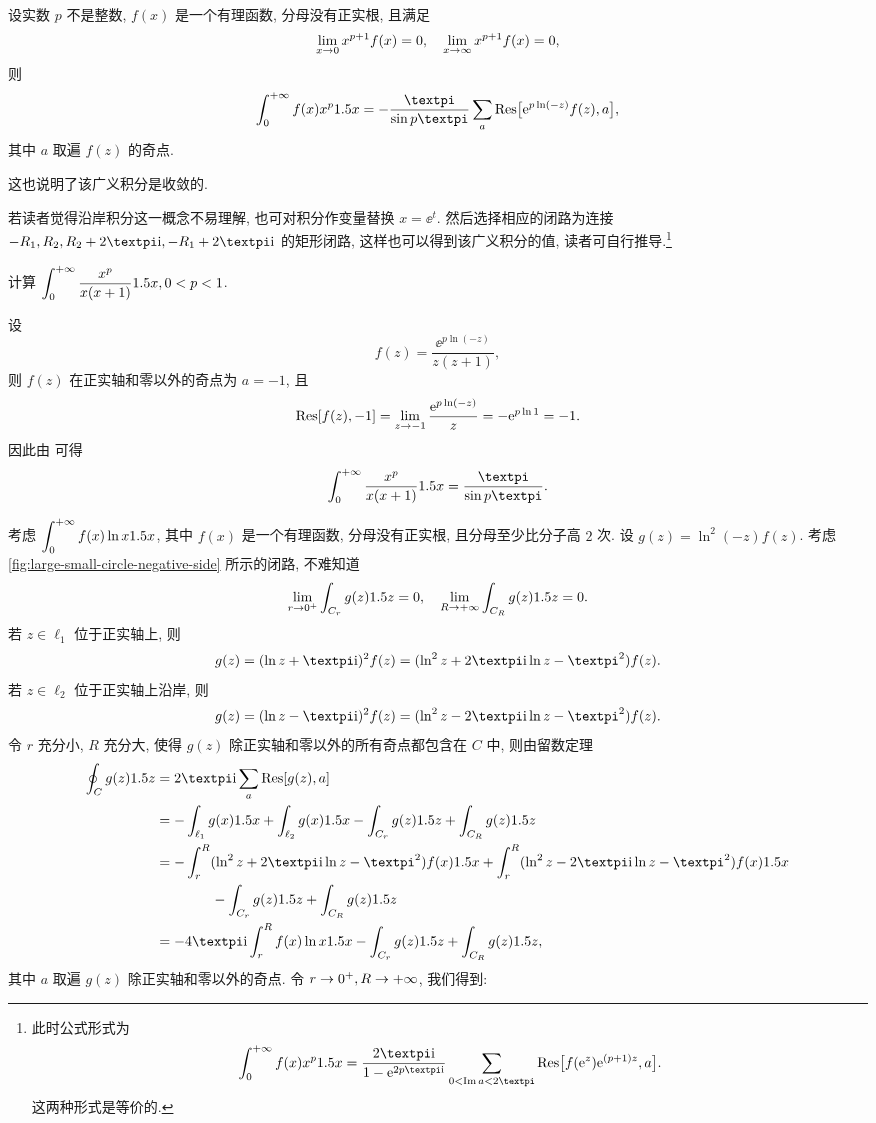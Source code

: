 \begin{theorem}
  \label{thm:integral-xp}
  设实数 $p$ 不是整数, $f(x)$ 是一个有理函数, 分母没有正实根, 且满足
  \[
    \lim_{x\rightarrow 0} x^{p+1}f(x)=0,\quad
    \lim_{x\rightarrow \infty} x^{p+1}f(x)=0,
  \]
  则
  \[
     \intf f(x)x^p\d x
    =-\frac{\cpi}{\sin{p\cpi}}\sum_a \Res\bigl[\ee^{p\ln(-z)}f(z),a\bigr],
  \]
  其中 $a$ 取遍 $f(z)$ 的奇点.
\end{theorem}
这也说明了该广义积分是收敛的.

若读者觉得沿岸积分这一概念不易理解, 也可对积分作变量替换 $x=\ee^t$.
然后选择相应的闭路为连接 $-R_1,R_2,R_2+2\cpi\ii,-R_1+2\cpi\ii$ 的矩形闭路, 这样也可以得到该广义积分的值, 读者可自行推导.\footnote{
  此时公式形式为
  \[
    \intf f(x)x^p\d x
    =\frac{2\cpi\ii}{1-\ee^{2p\cpi\ii}}\sum_{0<\Im a<2\cpi} \Res\bigl[f(\ee^z)\ee^{(p+1)z},a\bigr].
  \]
  这两种形式是等价的.
}

\begin{example}
  计算 $\displaystyle\int_0^{+\infty}\frac{x^p}{x(x+1)}1.5 x,0<p<1$.
\end{example}

\begin{solution}
  设
  \[
    f(z)=\frac{\ee^{p\ln(-z)}}{z(z+1)},
  \]
  则 $f(z)$ 在正实轴和零以外的奇点为 $a=-1$, 且
  \[
     {\mathrm{Res}}[f(z),-1]
    =\lim_{z\rightarrow-1}\frac{\mathrm{e}^{p\ln(-z)}}{z}
    =-\mathrm{e}^{p\ln 1}
    =-1.
  \]
  因此由 可得
  \[
     \intf\frac{x^p}{x(x+1)}\d x
    =\frac{\cpi}{\sin p\cpi}.
  \]
\end{solution}

考虑 $\displaystyle\int_0^{+\infty} f(x)\ln x1.5 x$, 其中 $f(x)$ 是一个有理函数, 分母没有正实根, 且分母至少比分子高 $2$ 次.
设 $g(z)=\ln^2(-z)f(z)$.
考虑\ref{fig:large-small-circle-negative-side} 所示的闭路, 不难知道
\[
  \lim_{r\rightarrow0^+}\int_{C_r}g(z)1.5 z=0,\quad 
  \lim_{R\rightarrow+\infty}\int_{C_R}g(z)1.5 z=0.
\]
若 $z\in\ell_1$ 位于正实轴上, 则
\[
   g(z)
  =(\ln z+\cpi\ii)^2f(z)
  =(\ln^2 z+2\cpi\ii \ln z-\cpi^2)f(z).
\]
若 $z\in\ell_2$ 位于正实轴上沿岸, 则
\[
   g(z)
  =(\ln z-\cpi\ii)^2f(z)
  =(\ln^2 z-2\cpi\ii \ln z-\cpi^2)f(z).
\]
令 $r$ 充分小, $R$ 充分大, 使得 $g(z)$ 除正实轴和零以外的所有奇点都包含在 $C$ 中, 则由留数定理
\begin{align*}
   \oint_C g(z)\d z&
  =2\cpi\ii\sum_a \Res[g(z),a]\\&
  =-\int_{\ell_1} g(x)\d x
    +\int_{\ell_2} g(x)\d x
    -\int_{C_r}g(z)\d z
    +\int_{C_R}g(z)\d z\\&
  =-\int_r^R (\ln^2 z+2\cpi\ii \ln z-\cpi^2)f(x)\d x
    +\int_r^R (\ln^2 z-2\cpi\ii \ln z-\cpi^2)f(x)\d x\\&
    \qquad \qquad 
    -\int_{C_r}g(z)\d z
    +\int_{C_R}g(z)\d z\\&
  =-4\cpi\ii \int_r^R f(x)\ln x\d x
  -\int_{C_r}g(z)\d z
  +\int_{C_R}g(z)\d z,
\end{align*}
其中 $a$ 取遍 $g(z)$ 除正实轴和零以外的奇点.
令 $r\rightarrow0^+,R\rightarrow +\infty$, 我们得到:

